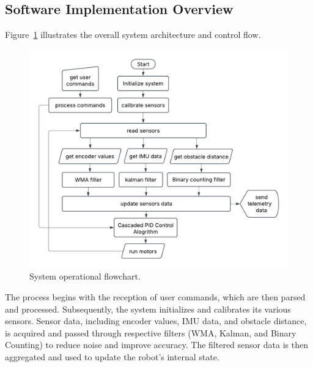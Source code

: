 \subsection{Software Implementation Overview} \label{sec:software_overview}
Figure~\ref{fig:code-overview-flowchart} illustrates the overall system architecture and control flow.
\begin{figure}[h]
	\centering
	\includegraphics[width=0.8\linewidth]{assets/code_overview_flowchart.png}
	\caption{System operational flowchart.}
	\label{fig:code-overview-flowchart}
\end{figure}

The process begins with the reception of user commands, which are then parsed and processed.  Subsequently, the system initializes and calibrates its various sensors.  Sensor data, including encoder values, IMU data, and obstacle distance, is acquired and passed through respective filters (WMA, Kalman, and Binary Counting) to reduce noise and improve accuracy.  The filtered sensor data is then aggregated and used to update the robot's internal state.

